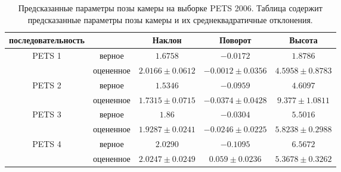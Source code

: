 \begin{table*}[t] 
	\begin{center}
		\captionsetup{width=15cm}
		\caption{Предсказанные параметры позы камеры на выборке PETS 2006. Таблица содержит предсказанные параметры позы камеры и их среднеквадратичные отклонения.} \label{tab:PETS}
		\begin{tabular}{|c|c|c|c|c|} 
			\hline
			последовательность & & Наклон & Поворот & Высота \\ \hline \hline
			\multirow{2}{*}{PETS 1} & верное & $1.6758$ & $-0.0172$ & $1.8786$  \\
			& оцененное & $2.0166 \pm 0.0612$ & $-0.0012 \pm 0.0356$ &  $4.5958 \pm 0.8783$ \\ \hline
			\multirow{2}{*}{PETS 2} & верное & $1.5346$ & $-0.0959$ & $4.6097$  \\
			& оцененное & $1.7315 \pm 0.0715$ & $-0.0374 \pm 0.0428$ &  $9.377 \pm 1.0811$ \\ \hline
			\multirow{2}{*}{PETS 3} & верное & $1.86$ & $-0.0304$ & $5.5016$ \\
			& оцененное & $1.9287 \pm 0.0241$ & $-0.0246 \pm 0.0225$ &  $5.8238 \pm 0.2988$ \\ \hline
			\multirow{2}{*}{PETS 4} & верное & $2.0290$ & $-0.1095$ & $6.5672$ \\
			& оцененное & $2.0247 \pm 0.0249$ & $0.059 \pm 0.0236$ & $5.3678 \pm 0.3262$ \\ \hline
		\end{tabular}
	\end{center}
\end{table*}